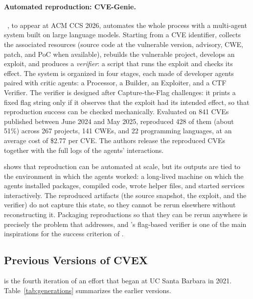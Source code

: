 \paragraph{Automated reproduction: CVE-Genie.}
\genie~\cite{ullah2026cvegenie}, to appear at ACM CCS 2026, automates the
whole process with a multi-agent system built on large language models.
Starting from a CVE identifier, \genie collects the associated resources
(source code at the vulnerable version, advisory, CWE, patch, and PoC when
available), rebuilds the vulnerable project, develops an exploit, and
produces a \emph{verifier}: a script that runs the exploit and checks its
effect. The system is organized in four stages, each made of
developer agents paired with critic agents: a Processor, a Builder, an
Exploiter, and a CTF Verifier. The verifier is designed after Capture-the-Flag
challenges: it prints a fixed flag string only if it observes that the
exploit had its intended effect, so that reproduction success can be checked
mechanically. Evaluated on 841 CVEs published between June 2024 and May 2025,
\genie reproduced 428 of them (about 51\%) across 267 projects, 141 CWEs, and
22 programming languages, at an average cost of \$2.77 per CVE. The authors
release the reproduced CVEs together with the full logs of the agents'
interactions.

\genie shows that reproduction can be automated at scale, but its outputs are
tied to the environment in which the agents worked: a long-lived machine on
which the agents installed packages, compiled code, wrote helper files, and
started services interactively. The reproduced artifacts (the source
snapshot, the exploit, and the verifier) do not capture this state, so they
cannot be rerun elsewhere without reconstructing it. Packaging reproductions
so that they can be rerun anywhere is precisely the problem that \cvex
addresses, and \genie's flag-based verifier is one of the main inspirations
for the success criterion of \cvexthree.

\subsection{Previous Versions of CVEX}

\cvexthree is the fourth iteration of an effort that began at UC Santa
Barbara in 2021. Table~\ref{tab:generations} summarizes the earlier versions.

